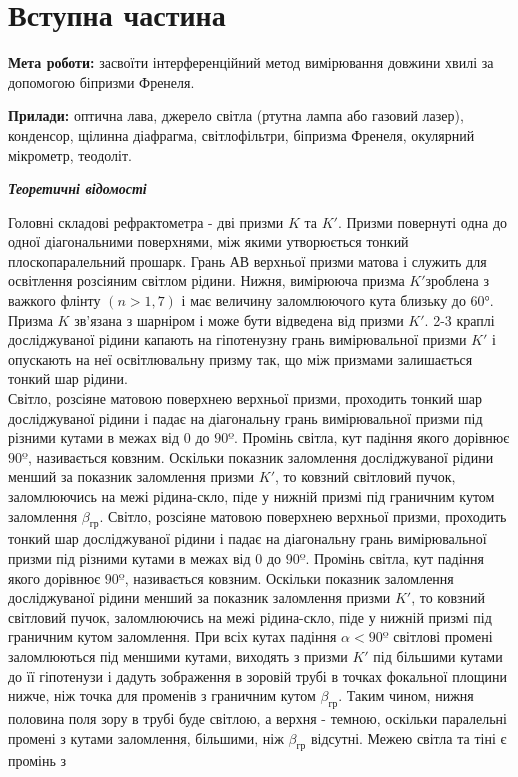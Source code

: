 \section{Вступна частина}
\setlength{\parindent}{4em}
\indent \textbf{Мета роботи:} засвоїти інтерференційний метод вимірювання довжини хвилі за допомогою
біпризми Френеля. \par
\textbf{Прилади:} оптична лава, джерело світла (ртутна лампа або газовий лазер), конденсор, щілинна діафрагма, світлофільтри, біпризма Френеля, окулярний мікрометр,
теодоліт.
\begin{center}
\textbf{\emph{Теоретичні відомості}}
\end{center}
\indent Головні складові рефрактометра - дві призми $K$ та $K'$. Призми повернуті одна до одної діагональними поверхнями, між якими утворюється тонкий плоскопаралельний прошарк. Грань АВ верхньої призми матова і служить для освітлення розсіяним світлом рідини. Нижня, вимірююча призма $K'$зроблена з важкого флінту $(n>1,7)$ і має
величину заломлюючого кута близьку до $60°$. Призма $K$ зв’язана з шарніром і може бути відведена від призми $K'$. 2-3 краплі досліджуваної рідини капають на гіпотенузну грань вимірювальної призми $K'$ і опускають на неї освітлювальну призму так, що між призмами залишається тонкий шар рідини. \\
Світло, розсіяне матовою поверхнею верхньої призми, проходить тонкий шар досліджуваної рідини і падає на діагональну грань вимірювальної призми під різними кутами в межах від 0 до $90º$. Промінь світла, кут падіння якого дорівнює $90º$, називається ковзним. Оскільки показник заломлення досліджуваної рідини менший за показник заломлення призми $K'$, то ковзний світловий пучок, заломлюючись на межі рідина-скло, піде у нижній призмі під граничним кутом заломлення ${\beta}_{гр}$. Світло, розсіяне матовою поверхнею верхньої призми, проходить тонкий шар досліджуваної рідини і падає на діагональну грань вимірювальної призми під різними кутами в межах від 0 до $90º$. Промінь світла, кут падіння якого дорівнює $90º$, називається ковзним. Оскільки показник заломлення досліджуваної рідини менший за показник заломлення призми
$K'$, то ковзний світловий пучок, заломлюючись на межі рідина-скло, піде у нижній призмі під граничним кутом заломлення. При всіх кутах падіння $\alpha<90º$ світлові промені заломлюються під меншими кутами, виходять з призми $K'$ під більшими кутами до її гіпотенузи і дадуть зображення в зоровій трубі в точках фокальної площини нижче, ніж точка для променів з граничним кутом ${\beta}_{гр}$. Таким чином, нижня половина поля зору в трубі буде світлою, а верхня - темною, оскільки паралельні промені з кутами заломлення, більшими, ніж ${\beta}_{гр}$ відсутні. Межею світла та тіні є промінь з
